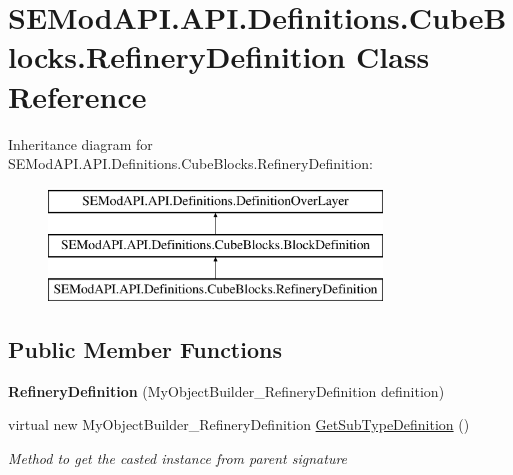 \hypertarget{class_s_e_mod_a_p_i_1_1_a_p_i_1_1_definitions_1_1_cube_blocks_1_1_refinery_definition}{}\section{S\+E\+Mod\+A\+P\+I.\+A\+P\+I.\+Definitions.\+Cube\+Blocks.\+Refinery\+Definition Class Reference}
\label{class_s_e_mod_a_p_i_1_1_a_p_i_1_1_definitions_1_1_cube_blocks_1_1_refinery_definition}
Inheritance diagram for S\+E\+Mod\+A\+P\+I.\+A\+P\+I.\+Definitions.\+Cube\+Blocks.\+Refinery\+Definition\+:\begin{figure}[H]
\begin{center}
\leavevmode
\includegraphics[height=3.000000cm]{class_s_e_mod_a_p_i_1_1_a_p_i_1_1_definitions_1_1_cube_blocks_1_1_refinery_definition}
\end{center}
\end{figure}
\subsection*{Public Member Functions}
\begin{DoxyCompactItemize}
\item 
\hypertarget{class_s_e_mod_a_p_i_1_1_a_p_i_1_1_definitions_1_1_cube_blocks_1_1_refinery_definition_a7077cab574c750b43fefa366417281d7}{}{\bfseries Refinery\+Definition} (My\+Object\+Builder\+\_\+\+Refinery\+Definition definition)\label{class_s_e_mod_a_p_i_1_1_a_p_i_1_1_definitions_1_1_cube_blocks_1_1_refinery_definition_a7077cab574c750b43fefa366417281d7}

\item 
virtual new My\+Object\+Builder\+\_\+\+Refinery\+Definition \hyperlink{class_s_e_mod_a_p_i_1_1_a_p_i_1_1_definitions_1_1_cube_blocks_1_1_refinery_definition_ada8b8be2c447857bbbd69e0cb3d22acf}{Get\+Sub\+Type\+Definition} ()
\begin{DoxyCompactList}\small\item\em Method to get the casted instance from parent signature \end{DoxyCompactList}\end{DoxyCompactItemize}
